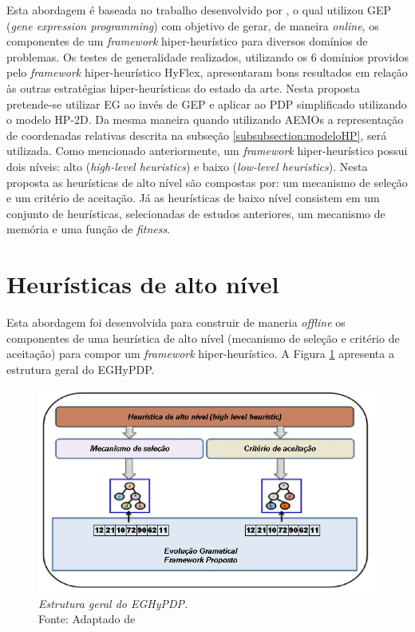 Esta abordagem é baseada no trabalho desenvolvido por \cite{sabar2015automatic}, o qual  utilizou GEP (\textit{gene expression programming}) com objetivo de gerar, de maneira \textit{online}, os componentes de um \textit{framework} hiper-heurístico para diversos domínios de problemas. Os testes de generalidade realizados, utilizando os 6 domínios providos pelo \textit{framework} hiper-heurístico HyFlex, apresentaram bons resultados em relação às outras estratégias hiper-heurísticas do estado da arte. Nesta proposta pretende-se utilizar EG ao invés de GEP e aplicar ao PDP simplificado utilizando o modelo HP-2D. Da mesma maneira quando utilizando  AEMOs a representação de coordenadas relativas descrita na subseção \ref{subsubsection:modeloHP}, será utilizada. Como mencionado anteriormente, um \textit{framework} hiper-heurístico possui dois níveis: alto (\textit{high-level heuristics}) e baixo (\textit{low-level heuristics}). Nesta proposta as heurísticas de alto nível são compostas por: um mecanismo de seleção e um critério de aceitação. Já as heurísticas de baixo nível consistem em um conjunto de heurísticas, selecionadas de estudos anteriores, um mecanismo de memória e uma função de \textit{fitness}. 

\section{Heurísticas de alto nível}
\label{sec:highlevelheuristics}
Esta abordagem  foi desenvolvida para construir de maneria \textit{offline} os componentes de uma heurística de alto nível (mecanismo de seleção e critério de aceitação) para compor um \textit{framework} hiper-heurístico. A Figura \ref{fig:proposedFramework} apresenta a estrutura geral do EGHyPDP. 

\begin{figure}[!htb]
	\centering
	\includegraphics[scale=.98]{Imagens/proposedFramework.png}
	\caption{ \textit{Estrutura geral do EGHyPDP.} \\ Fonte: Adaptado de \cite{sabar2015automatic}}
	\label{fig:proposedFramework}
\end{figure}


